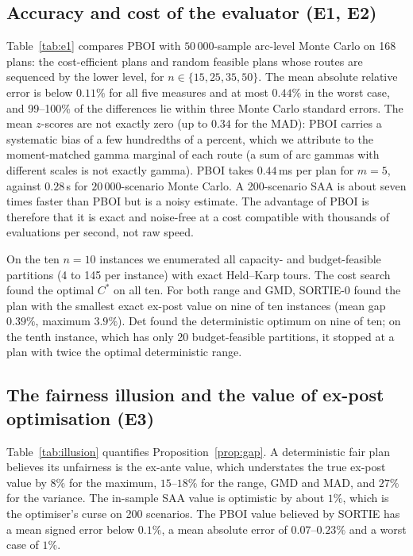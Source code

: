 \documentclass[11pt]{article}
\theoremstyle{definition}
\begin{document}
\subsection{Accuracy and cost of the evaluator (E1, E2)}
Table~\ref{tab:e1} compares PBOI with $50\,000$-sample arc-level Monte Carlo
on 168 plans: the cost-efficient plans and random feasible plans whose
routes are sequenced by the lower level, for $n\in\{15,25,35,50\}$. The mean absolute
relative error is below $0.11\%$ for all five measures and at most $0.44\%$ in
the worst case, and 99--100\% of the differences lie within three Monte Carlo
standard errors. The mean $z$-scores are not exactly zero (up to $0.34$ for the
MAD): PBOI carries a systematic bias of a few hundredths of a percent, which
we attribute to the moment-matched gamma marginal of each route (a sum of arc
gammas with different scales is not exactly gamma). PBOI takes $0.44$\,ms per plan for $m=5$, against
$0.28$\,s for $20\,000$-scenario Monte Carlo. A 200-scenario SAA is about
seven times faster than PBOI but is a noisy estimate. The advantage of PBOI is
therefore that it is exact and noise-free at a cost compatible with thousands
of evaluations per second, not raw speed.

\begin{table}[t]\centering\small
\caption{E1: PBOI against arc-level Monte Carlo ($50\,000$ samples) on 168 plans; $z$: difference over its Monte Carlo standard error.}\label{tab:e1}

\end{table}

On the ten $n=10$ instances we enumerated all capacity- and budget-feasible
partitions (4 to 145 per instance) with exact Held--Karp tours. The cost
search found the optimal $C^\ast$ on all ten. For both range and GMD, SORTIE-0
found the plan with the smallest exact ex-post value on nine of ten
instances (mean gap $0.39\%$, maximum $3.9\%$). Det found the deterministic
optimum on nine of ten; on the tenth instance, which has only 20
budget-feasible partitions, it stopped at a plan with twice the optimal
deterministic range.

\subsection{The fairness illusion and the value of ex-post optimisation (E3)}
Table~\ref{tab:illusion} quantifies Proposition~\ref{prop:gap}. A
deterministic fair plan believes its unfairness is the ex-ante value, which
understates the true ex-post value by $8\%$ for the maximum, $15$--$18\%$ for
the range, GMD and MAD, and $27\%$ for the variance. The in-sample SAA value is optimistic by
about $1\%$, which is the optimiser's curse on 200 scenarios. The PBOI value
believed by SORTIE has a mean signed error below $0.1\%$, a mean absolute
error of $0.07$--$0.23\%$ and a worst case of $1\%$.
\end{document}

